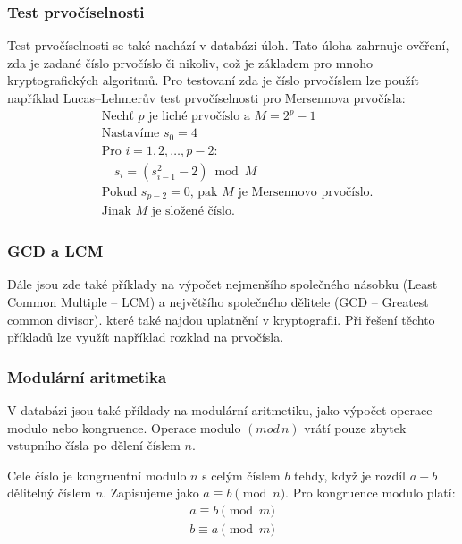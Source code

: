 \documentclass[titlepage]{article}
\begin{document}
\subsubsection{Test prvočíselnosti}
Test prvočíselnosti se také nachází v databázi úloh. Tato úloha zahrnuje ověření, zda je zadané číslo prvočíslo či nikoliv, což je základem pro mnoho kryptografických algoritmů. Pro testovaní zda je číslo prvočíslem lze použít například Lucas–Lehmerův test prvočíselnosti pro Mersennova prvočísla:
\begin{align*}
    &\text{Nechť } p \text{ je liché prvočíslo a } M = 2^p-1 \\
    &\text{Nastavíme } s_0 = 4 \\
    &\text{Pro } i=1,2,\dots,p-2: \\
    &\quad s_i = (s_{i-1}^2-2) \bmod M \\
    &\text{Pokud } s_{p-2} = 0 \text{, pak } M \text{ je Mersennovo prvočíslo.} \\
    &\text{Jinak } M \text{ je složené číslo.}
\end{align*}

\subsubsection{GCD a LCM}
Dále jsou zde také příklady na výpočet nejmenšího společného ná\-so\-bku (Le\-ast Com\-mon Multiple -- LCM) 
a největšího společného dělitele (GCD -- Greatest common divisor). 
které také najdou uplatnění v kryptografii. Při řešení těchto příkladů lze využít například rozklad na prvočísla.
\newline

\subsubsection{Modulární aritmetika}
V databázi jsou také příklady na modulární aritmetiku, jako výpočet operace modulo nebo kongruence. 
Operace modulo $(mod\,n)$ vrátí pouze zbytek vstupního čísla po
dělení číslem $n$.


Cele číslo je kongruentní modulo $n$ s celým číslem $b$ tehdy, když
je rozdíl $a - b$ dělitelný číslem $n$. Zapisujeme jako $a \equiv b \pmod n$.
Pro kongruence modulo platí:
\begin{align*}
    a \equiv b \pmod{m} \\
    b \equiv a \pmod{m} \\
\end{align*}
\end{document}
